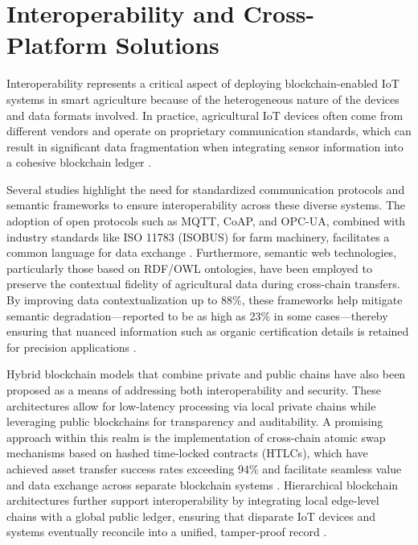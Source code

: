\documentclass[12pt,onecolumn]{IEEEtran} %
\begin{document}
\section{Interoperability and Cross-Platform Solutions}
Interoperability represents a critical aspect of deploying blockchain-enabled IoT systems in smart agriculture because of the heterogeneous nature of the devices and data formats involved. In practice, agricultural IoT devices often come from different vendors and operate on proprietary communication standards, which can result in significant data fragmentation when integrating sensor information into a cohesive blockchain ledger \cite{irfan2025aniotdrivensmart, aliyu2023blockchainbasedsmartfarm}.

Several studies highlight the need for standardized communication protocols and semantic frameworks to ensure interoperability across these diverse systems. The adoption of open protocols such as MQTT, CoAP, and OPC-UA, combined with industry standards like ISO 11783 (ISOBUS) for farm machinery, facilitates a common language for data exchange \cite{irfan2025aniotdrivensmart, abdurrohim2024blockchainbasedframeworkfor}. Furthermore, semantic web technologies, particularly those based on RDF/OWL ontologies, have been employed to preserve the contextual fidelity of agricultural data during cross-chain transfers. By improving data contextualization up to 88\%, these frameworks help mitigate semantic degradation---reported to be as high as 23\% in some cases---thereby ensuring that nuanced information such as organic certification details is retained for precision applications \cite{irfan2025aniotdrivensmart, huang2025digitaltraceabilityin}.

Hybrid blockchain models that combine private and public chains have also been proposed as a means of addressing both interoperability and security. These architectures allow for low-latency processing via local private chains while leveraging public blockchains for transparency and auditability. A promising approach within this realm is the implementation of cross-chain atomic swap mechanisms based on hashed time-locked contracts (HTLCs), which have achieved asset transfer success rates exceeding 94\% and facilitate seamless value and data exchange across separate blockchain systems \cite{abdurrohim2024blockchainbasedframeworkfor, huang2025digitaltraceabilityin}. Hierarchical blockchain architectures further support interoperability by integrating local edge-level chains with a global public ledger, ensuring that disparate IoT devices and systems eventually reconcile into a unified, tamper-proof record \cite{thiruvenkatasamy2025anonlinetool, irfan2025aniotdrivensmart}.
\end{document}
